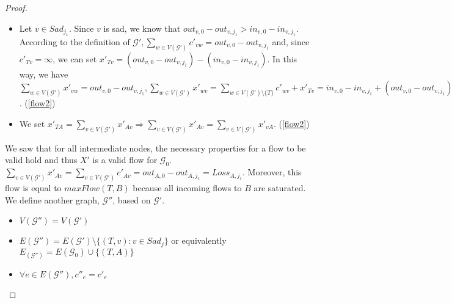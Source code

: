 \documentclass[11pt]{article}
\theoremstyle{definition}
\theoremstyle{corollary}
\theoremstyle{lemma}
\begin{document}
\begin{proof}
\begin{itemize}
          of $\mathcal{G}', \sum\limits_{w \in V(\mathcal{G}')}c'_{vw} = out_{v, 0} - out_{v, j_1} \wedge \sum\limits_{w \in
          V(\mathcal{G}')}c'_{wv} = in_{v, 0} - in_{v, j_1}$. Combining these observations, we have that $\sum\limits_{w \in
          V(\mathcal{G}')}c'_{vw} = \sum\limits_{w \in V(\mathcal{G}')}c'_{wv}$. (\ref{flow2})
          \item Let $v \in Sad_{j_1}$. Since $v$ is sad, we know that $out_{v, 0} - out_{v, j_1} > in_{v, 0} - in_{v, j_1}$.
          According to the definition of $\mathcal{G}', \sum\limits_{w \in V(\mathcal{G}')}c'_{vw} = out_{v, 0} -
          out_{v, j_1}$ and, since $c'_{Tv} = \infty$, we can set $x'_{Tv} = (out_{v, 0} - out_{v, j_1}) - (in_{v, 0} -
          in_{v, j_1})$. In this way, we have $\sum\limits_{w \in V(\mathcal{G}')}x'_{vw} = out_{v, 0} - out_{v, j_1},
          \sum\limits_{w \in V(\mathcal{G}')}x'_{wv} = \sum\limits_{w \in V(\mathcal{G}') \setminus \{T\}}c'_{wv} + x'_{Tv} =
          in_{v, 0} - in_{v, j_1} + (out_{v, 0} - out_{v, j_1}) - (in_{v, 0} - in_{v, j_1}) = out_{v, 0} - out_{v, j_1}
          \Rightarrow \sum\limits_{w \in V(\mathcal{G}')}x'_{vw} = \sum\limits_{w \in V(\mathcal{G}')}x'_{wv}$. (\ref{flow2})
          \item We set $x'_{TA} = \sum\limits_{v \in V(\mathcal{G}')}x'_{Av} \Rightarrow \sum\limits_{v \in
          V(\mathcal{G}')}x'_{Av} = \sum\limits_{v \in V(\mathcal{G}')}x'_{vA}$. (\ref{flow2})
       \end{itemize}
       We saw that for all intermediate nodes, the necessary properties for a flow to be valid hold and thus $X'$ is a valid
       flow for $\mathcal{G}_0$. $\sum\limits_{v \in V(\mathcal{G}')}x'_{Av} = \sum\limits_{v \in V(\mathcal{G}')}c'_{Av} =
       out_{A, 0} - out_{A, j_1} = Loss_{A, j_1}$. Moreover, this flow is equal to $maxFlow(T, B)$ because all incoming flows
       to $B$ are saturated.
       We define another graph, $\mathcal{G}''$, based on $\mathcal{G}'$.
       \begin{itemize}
          \item $V(\mathcal{G}'') = V(\mathcal{G}')$
          \item $E(\mathcal{G}'') = E(\mathcal{G}') \setminus \{(T, v) : v \in Sad_j\}$ or equivalently $E_(\mathcal{G}'') =
          E(\mathcal{G}_0) \cup \{(T, A)\}$
          \item $\forall e \in E(\mathcal{G}''), c''_e = c'_e$

\end{itemize}
\end{proof}
\end{document}
